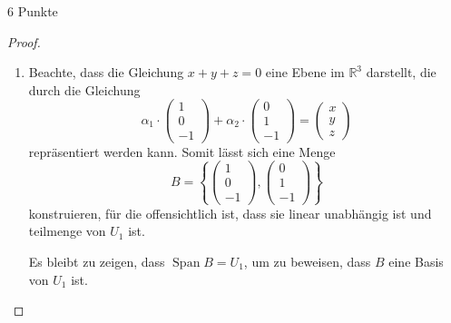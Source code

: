 \documentclass{problemset}
\begin{document}
\begin{problem}{6 Punkte}
\begin{proof}
    \begin{enumerate}
        \item Beachte, dass die Gleichung $x + y + z = 0$ eine Ebene im
              $\mathbb{R}^3$ darstellt, die durch die Gleichung
              \[
                  \alpha_1 \cdot \begin{pmatrix}
                      1 \\
                      0 \\
                      -1
                  \end{pmatrix} + \alpha_2 \cdot \begin{pmatrix}
                      0 \\
                      1 \\
                      -1
                  \end{pmatrix} = \begin{pmatrix}
                      x \\
                      y \\
                      z
                  \end{pmatrix}
              \]
              repräsentiert werden kann. Somit lässt sich eine Menge
              \[
                  B = \left\{\begin{pmatrix}
                      1 \\
                      0 \\
                      -1
                  \end{pmatrix}, \begin{pmatrix}
                      0 \\
                      1 \\
                      -1
                  \end{pmatrix}\right\}
              \]
              konstruieren, für die offensichtlich ist, dass sie linear
              unabhängig ist und teilmenge von $U_1$ ist.

              Es bleibt zu zeigen, dass $\operatorname{Span} B = U_1$, um zu
              beweisen, dass $B$ eine Basis von $U_1$ ist.


\end{enumerate}
\end{proof}
\end{problem}
\end{document}
